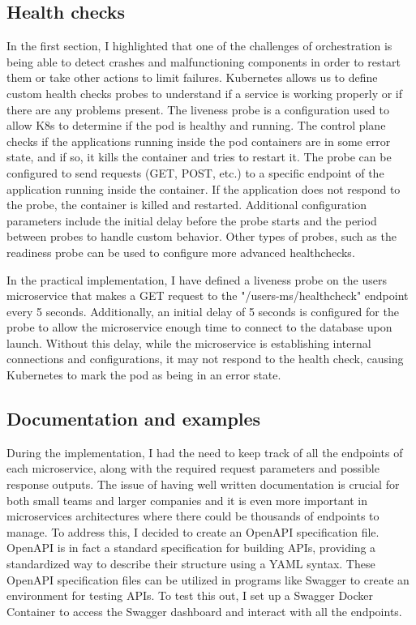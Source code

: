 \documentclass[manuscript,screen,review]{acmart}
\begin{document}
\subsection{Health checks}
In the first section, I highlighted that one of the challenges of orchestration is being able to detect crashes and malfunctioning components in order to restart them or take other actions to limit failures. Kubernetes allows us to define custom health checks probes to understand if a service is working properly or if there are any problems present.
The liveness probe is a configuration used to allow K8s to determine if the pod is healthy and running. The control plane checks if the applications running inside the pod containers are in some error state, and if so, it kills the container and tries to restart it. The probe can be configured to send requests (GET, POST, etc.) to a specific endpoint of the application running inside the container. If the application does not respond to the probe, the container is killed and restarted. Additional configuration parameters include the initial delay before the probe starts and the period between probes to handle custom behavior. Other types of probes, such as the readiness probe can be used to configure more advanced healthchecks.

In the practical implementation, I have defined a liveness probe on the users microservice that makes a GET request to the "/users-ms/healthcheck" endpoint every 5 seconds. Additionally, an initial delay of 5 seconds is configured for the probe to allow the microservice enough time to connect to the database upon launch. Without this delay, while the microservice is establishing internal connections and configurations, it may not respond to the health check, causing Kubernetes to mark the pod as being in an error state.

\subsection{Documentation and examples}
During the implementation, I had the need to keep track of all the endpoints of each microservice, along with the required request parameters and possible response outputs. The issue of having well written documentation is crucial for both small teams and larger companies and it is even more important in microservices architectures where there could be thousands of endpoints to manage. To address this, I decided to create an OpenAPI specification file. OpenAPI is in fact a standard specification for building APIs, providing a standardized way to describe their structure using a YAML syntax. These OpenAPI specification files can be utilized in programs like Swagger to create an environment for testing APIs. To test this out, I set up a Swagger Docker Container to access the Swagger dashboard and interact with all the endpoints.
\end{document}
